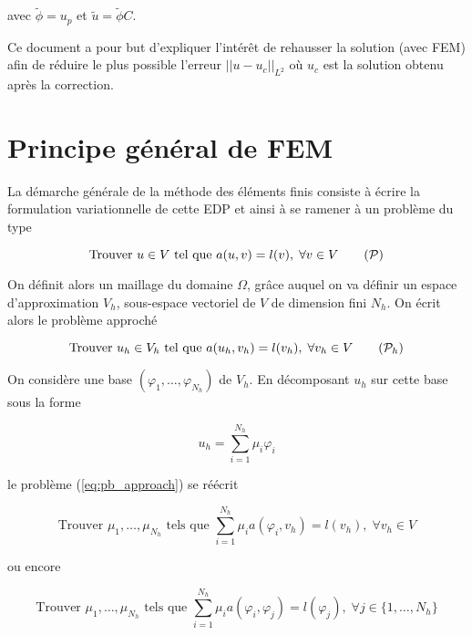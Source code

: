avec $\tilde{\phi}=u_p$ et $\tilde{u}=\tilde{\phi}C$.

Ce document a pour but d'expliquer l'intérêt de rehausser la solution (avec FEM) afin de réduire le plus possible l'erreur $||u-u_{c}||_{L^2}$ où $u_{c}$ est la solution obtenu après la correction.

\section*{Principe général de FEM}

La démarche générale de la méthode des éléments finis consiste à écrire la formulation variationnelle de cette EDP et ainsi à se ramener à un problème du type

\begin{equation}
	\text{Trouver } u\in V \text{ tel que } a(u,v)=l(v), \;\forall v\in V \tag{$\mathcal{P}$}
\end{equation}

On définit alors un maillage du domaine $\Omega$, grâce auquel on va définir un espace d'approximation $V_h$, sous-espace vectoriel de $V$ de dimension fini $N_h$. On écrit alors le problème approché

\begin{equation}
	\text{Trouver } u_h\in V_h \text{ tel que } a(u_h,v_h)=l(v_h), \;\forall v_h\in V \tag{$\mathcal{P}_h$} \label{eq:pb_approach}
\end{equation}

On considère une base $(\varphi_1,\dots,\varphi_{N_h})$ de $V_h$. En décomposant $u_h$ sur cette base sous la forme

\begin{equation}
	\label{decomp1}
	u_h=\sum_{i=1}^{N_h}\mu_i\varphi_i	
\end{equation}

le problème (\ref{eq:pb_approach}) se réécrit 

\begin{equation*}
	\text{Trouver } \mu_1,\dots,\mu_{N_h} \text{ tels que } \sum_{i=1}^{N_h}\mu_i a(\varphi_i,v_h)=l(v_h), \;\forall v_h\in V 
\end{equation*}

ou encore

\begin{equation*}
	\text{Trouver } \mu_1,\dots,\mu_{N_h} \text{ tels que } \sum_{i=1}^{N_h}\mu_i a(\varphi_i,\varphi_j)=l(\varphi_j), \;\forall j\in \{1,\dots,N_h\}
\end{equation*}

